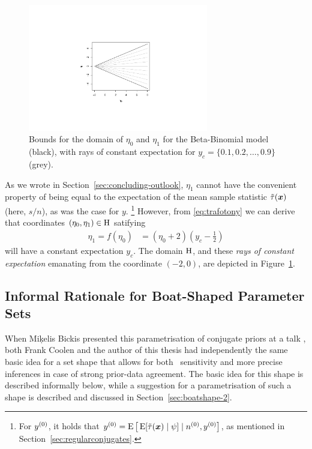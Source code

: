 \begin{figure}  %
\centering
\includegraphics[trim = 80mm 45mm 80mm 60mm, clip, width=0.7\textwidth]{R/boatshape-domain}%
\caption[Bounds for the domain of $\eta_0$ and $\eta_1$ for the Beta-Binomial model,
with rays of constant expectation for $y_c = \{0.1,0.2,\ldots,0.9\}$.]%
{Bounds for the domain of $\eta_0$ and $\eta_1$ for the Beta-Binomial model (black),
with rays of constant expectation for $y_c = \{0.1,0.2,\ldots,0.9\}$ (grey).}
\label{fig:boatshape-domain}
\end{figure}

As we wrote in Section~\ref{sec:concluding-outlook},
$\eta_1$ cannot have the convenient property of being equal to
the expectation of the mean sample statistic $\tilde{\tau}({\bm x})$ (here, $s/n$),
as was the case for $y$.%
\footnote{For $y^{(0)}$, it holds that $y^{(0)} = \operatorname{E}\big[\operatorname{E}[\tilde{\tau}({\bm x}) \mid \psi] \mid n^{(0)}, y^{(0)}\big]$,
as mentioned in Section~\ref{sec:regularconjugates}.}
However, from \eqref{eq:trafotony} we can derive that coordinates $(\eta_0,\eta_1) \in \mathrm{H}$ satifying
\begin{align}
\label{eq:raysofconstantexpectation}
\eta_1 = f(\eta_0) &= (\eta_0 + 2)(y_c - \frac{1}{2}) 
\end{align}
will have a constant expectation $y_c$.
The domain $\mathrm{H}$, and these \emph{rays of constant expectation} emanating from the coordinate $(-2,0)$,
are depicted in Figure~\ref{fig:boatshape-domain}.


\subsection{Informal Rationale for Boat-Shaped Parameter Sets}
\label{boatshape-rationale}

When Mi\c{k}elis Bickis presented this parametrisation of conjugate priors at a talk \parencite{2011:bickis:geomip},
both Frank Coolen and the author of this thesis had independently the same basic idea
for a set shape that allows for both \pdc\ sensitivity
and more precise inferences in case of strong prior-data agreement.
The basic idea for this shape is described informally below,
while a suggestion for a parametrisation of such a shape is described and discussed
in Section~\ref{sec:boatshape-2}.

